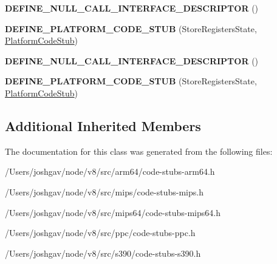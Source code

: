 \begin{DoxyCompactItemize}
\item 
{\bfseries D\+E\+F\+I\+N\+E\+\_\+\+N\+U\+L\+L\+\_\+\+C\+A\+L\+L\+\_\+\+I\+N\+T\+E\+R\+F\+A\+C\+E\+\_\+\+D\+E\+S\+C\+R\+I\+P\+T\+OR} ()\hypertarget{classv8_1_1internal_1_1_store_registers_state_stub_adc9bb5c33baab06dc4de44524798a5ba}{}\label{classv8_1_1internal_1_1_store_registers_state_stub_adc9bb5c33baab06dc4de44524798a5ba}

\item 
{\bfseries D\+E\+F\+I\+N\+E\+\_\+\+P\+L\+A\+T\+F\+O\+R\+M\+\_\+\+C\+O\+D\+E\+\_\+\+S\+T\+UB} (Store\+Registers\+State, \hyperlink{classv8_1_1internal_1_1_platform_code_stub}{Platform\+Code\+Stub})\hypertarget{classv8_1_1internal_1_1_store_registers_state_stub_ae017aa864ce3fdfc7425b095b84ad599}{}\label{classv8_1_1internal_1_1_store_registers_state_stub_ae017aa864ce3fdfc7425b095b84ad599}

\item 
{\bfseries D\+E\+F\+I\+N\+E\+\_\+\+N\+U\+L\+L\+\_\+\+C\+A\+L\+L\+\_\+\+I\+N\+T\+E\+R\+F\+A\+C\+E\+\_\+\+D\+E\+S\+C\+R\+I\+P\+T\+OR} ()\hypertarget{classv8_1_1internal_1_1_store_registers_state_stub_adc9bb5c33baab06dc4de44524798a5ba}{}\label{classv8_1_1internal_1_1_store_registers_state_stub_adc9bb5c33baab06dc4de44524798a5ba}

\item 
{\bfseries D\+E\+F\+I\+N\+E\+\_\+\+P\+L\+A\+T\+F\+O\+R\+M\+\_\+\+C\+O\+D\+E\+\_\+\+S\+T\+UB} (Store\+Registers\+State, \hyperlink{classv8_1_1internal_1_1_platform_code_stub}{Platform\+Code\+Stub})\hypertarget{classv8_1_1internal_1_1_store_registers_state_stub_ae017aa864ce3fdfc7425b095b84ad599}{}\label{classv8_1_1internal_1_1_store_registers_state_stub_ae017aa864ce3fdfc7425b095b84ad599}

\end{DoxyCompactItemize}
\subsection*{Additional Inherited Members}


The documentation for this class was generated from the following files\+:\begin{DoxyCompactItemize}
\item 
/\+Users/joshgav/node/v8/src/arm64/code-\/stubs-\/arm64.\+h\item 
/\+Users/joshgav/node/v8/src/mips/code-\/stubs-\/mips.\+h\item 
/\+Users/joshgav/node/v8/src/mips64/code-\/stubs-\/mips64.\+h\item 
/\+Users/joshgav/node/v8/src/ppc/code-\/stubs-\/ppc.\+h\item 
/\+Users/joshgav/node/v8/src/s390/code-\/stubs-\/s390.\+h\end{DoxyCompactItemize}
